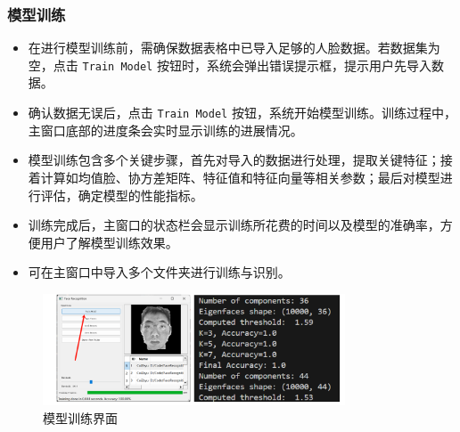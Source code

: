 \documentclass{article}
\begin{document}
\subsubsection{模型训练}
\begin{itemize}
    \item 在进行模型训练前，需确保数据表格中已导入足够的人脸数据。若数据集为空，点击 \texttt{Train Model} 按钮时，系统会弹出错误提示框，提示用户先导入数据。
    \item 确认数据无误后，点击 \texttt{Train Model} 按钮，系统开始模型训练。训练过程中，主窗口底部的进度条会实时显示训练的进展情况。
    \item 模型训练包含多个关键步骤，首先对导入的数据进行处理，提取关键特征；接着计算如均值脸、协方差矩阵、特征值和特征向量等相关参数；最后对模型进行评估，确定模型的性能指标。
    \item 训练完成后，主窗口的状态栏会显示训练所花费的时间以及模型的准确率，方便用户了解模型训练效果。
    \item 可在主窗口中导入多个文件夹进行训练与识别。
\end{itemize}

\begin{figure}[H]
    \centering
    \includegraphics[width=0.8\textwidth]{Img/PixPin_2025-03-09_00-52-21.png}
    \caption{模型训练界面}
\end{figure}
\end{document}
